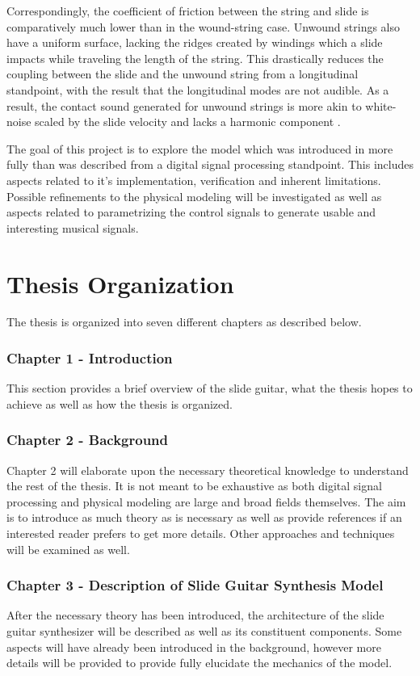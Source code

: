 \documentclass[../main.tex]{subfiles}
\begin{document}
Correspondingly, the coefficient of friction between the string and slide is comparatively much lower than in the wound-string case. Unwound strings also have a uniform surface, lacking the ridges created by windings which a slide impacts while traveling the length of the string. This drastically reduces the coupling between the slide and the unwound string from a longitudinal standpoint, with the result that the longitudinal modes are not audible. As a result, the contact sound generated for unwound strings is more akin to white-noise scaled by the slide velocity and lacks a harmonic component . 

The goal of this project is to explore the model which was introduced in  more fully than was described from a digital signal processing standpoint. This includes aspects related to it's implementation, verification and inherent limitations. Possible refinements to the physical modeling will be investigated as well as aspects related to parametrizing the control signals to generate usable and interesting musical signals.

\section{Thesis Organization}
The thesis is organized into seven different chapters as described below.

\subsubsection{Chapter 1 - Introduction}
This section provides a brief overview of the slide guitar, what the thesis hopes to achieve as well as how the thesis is organized.

\subsubsection{Chapter 2 - Background}
Chapter 2 will  elaborate upon the necessary theoretical knowledge to understand the rest of the thesis. It is not meant to be exhaustive as both digital signal processing and physical modeling are large and broad fields themselves. The aim is to introduce as much theory as is necessary as well as provide references if an interested reader prefers to get more details. Other approaches and techniques will be examined as well.

\subsubsection{Chapter 3 - Description of Slide Guitar Synthesis Model}
After the necessary theory has been introduced, the architecture of the slide guitar synthesizer will be described as well as its constituent components. Some aspects will have already been introduced in the background, however more details will be provided to provide fully elucidate the mechanics of the model.
\end{document}
